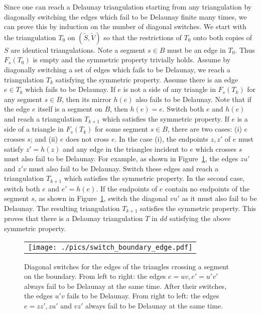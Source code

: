 \documentclass[11pt]{article}
\newenvironment{proof}[1][Proof]{\begin{trivlist}
\item[\hskip \labelsep {\bfseries #1}]}{\end{trivlist}}
\begin{document}
\begin{proof}
Since one can reach a Delaunay triangulation starting from any triangulation by diagonally
switching the edges which fail to be Delaunay finite many times, we can prove this by induction
on the number of diagonal switches. We start with the triangulation $T_0$ on $(\tilde{S}, \tilde{V})$ 
so that the restrictions of $T_0$ onto both copies of $S$ are identical triangulations. Note a segment 
$s\in B$ must be an edge in $T_0$. Thus $F_s(T_0)$ is empty and the symmetric property trivially holds.
Assume by diagonally switching a set of edges which fails to be Delaunay, we reach a triangulation $T_k$ 
satisfying the symmetric property. Assume there is an edge $e\in T_k$ which fails to be Delaunay. If $e$ 
is not a side of any triangle in $F_s(T_k)$ for any segment $s\in B$, then its mirror $h(e)$ also fails 
to be Delaunay. Note that if the edge $e$ itself is a segment on $B$, then $h(e) = e$. Switch both $e$ 
and $h(e)$ and reach a triangulation $T_{k+1}$ which satisfies the symmetric property. If $e$ is a side of a 
triangle in $F_s(T_k)$ for some segment $s\in B$, there are two cases: (i) $e$ crosses $s$; 
and (ii) $e$ does not cross $e$. In the case (i), the endpoints $z, z'$ of $e$ must satisfy
$z'=h(z)$ and any edge in the triangles incident to $e$ which crosses $s$ must also fail to be Delaunay.  
For example, as shown in Figure~\ref{fig:switch_boundary_edge}, the edges $zu'$ and $z'v$ must also fail 
to be Delaunay. Switch these edges and reach a triangulation $T_{k+1}$ which satisfies the symmetric property. 
In the second case, switch both $e$ and $e'=h(e)$. If the endpoints of $e$ contain no endpoints of the segment 
$s$, as shown in Figure~\ref{fig:switch_boundary_edge}, switch the diagonal $vu'$ as it must also fail to be Delaunay. 
The resulting triangulation $T_{k+1}$ satisfies the symmetric property. This proves that there is a 
Delaunay triangulation $T$ in $dd$ satisfying the above symmetric property. 

\begin{figure}[!t]
\begin{center}
\begin{tabular}{c}
\texttt{[image: ./pics/switch\_boundary\_edge.pdf]}\\
\end{tabular}
\end{center}
\vspace{-0.1in}
\caption{Diagonal switches for the edges of the triangles crossing a segment on the boundary.
From left to right: the edges $e =uv, e'=u'v'$ always fail to be Delaunay at the same time. 
After their switches, the edges $u'v$ fails to be Delaunay. From right to left: the edges $e=zz', 
zu'$ and $vz'$ always fail to be Delaunay at the same time.  
\label{fig:switch_boundary_edge}}
\end{figure}


\end{proof}
\end{document}
